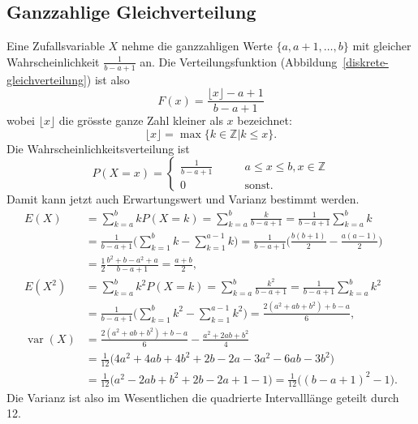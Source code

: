 \subsection{Ganzzahlige Gleichverteilung}
Eine Zufallsvariable $X$ nehme die ganzzahligen Werte $\{a,a+1,\dots,b\}$ mit 
gleicher Wahrscheinlichkeit $\frac1{b-a+1}$ an.
Die Verteilungsfunktion
(Abbildung~\ref{diskrete-gleichverteilung})
ist also
\[
F(x)=
\frac{\lfloor x \rfloor -a+1}{b-a+1}
\]
wobei $\lfloor x \rfloor$ die grösste ganze Zahl kleiner als $x$
bezeichnet:
\[
\lfloor x\rfloor = \max\{k\in\mathbb Z|k\le x\}.
\]
Die Wahrscheinlichkeitsverteilung ist
\[
P(X=x)=\begin{cases}
\displaystyle \frac1{b-a+1}&\qquad a\le x\le b,x\in\mathbb Z\\
0&\qquad\text{sonst}.
\end{cases}
\]
Damit kann jetzt auch Erwartungswert und Varianz bestimmt werden.
{\allowdisplaybreaks
\begin{align*}
E(X)
&=
\sum_{k=a}^b kP(X=k)
=
\sum_{k=a}^b \frac{k}{b-a+1}
=
\frac1{b-a+1}\sum_{k=a}^bk
\\
&=
\frac1{b-a+1}\biggl(
\sum_{k=1}^bk-\sum_{k=1}^{a-1}k
\biggr)
=
\frac1{b-a+1}\biggl(
\frac{b(b+1)}2-\frac{a(a-1)}2
\biggr)
\\
&=
\frac12\frac{b^2+b-a^2+a}{b-a+1}=\frac{a+b}2,
\\
E(X^2)
&=
\sum_{k=a}^b k^2P(X=k)
=
\sum_{k=a}^b \frac{k^2}{b-a+1}
=
\frac1{b-a+1}\sum_{k=a}^bk^2
\\
&=
\frac1{b-a+1}\biggl(
\sum_{k=1}^bk^2-\sum_{k=1}^{a-1}k^2
\biggr)
=
\frac{ 2(a^2+ab+b^2)+b-a}{6},
\\
\operatorname{var}(X)
&=
\frac{ 2(a^2+ab+b^2)+b-a}{6}
-
\frac{a^2+2ab+b^2}{4}
\\
&=
\frac1{12}\bigl(
4a^2+4ab+4b^2+2b-2a-3a^2-6ab-3b^2
\bigr)
\\
&=
\frac1{12}\bigl(
a^2-2ab+b^2+2b-2a+1-1
\bigr)
=
\frac1{12}\bigl((b-a+1)^2 - 1\bigr).
\end{align*}
}
Die Varianz ist also im Wesentlichen die quadrierte Intervalllänge
geteilt durch 12.
